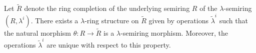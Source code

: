 Let $\tilde{R}$ denote the ring completion of the underlying semiring $R$ of the $\lambda$-semiring $(R, \lambda^i)$. There exists a $\lambda$-ring structure on $\tilde{R}$ given by operations $\tilde{\lambda}^i$ such that the natural morphism $\theta: R \to \tilde{R}$ is a $\lambda$-semiring morphism. Moreover, the operations $\tilde{\lambda}^i$ are unique with respect to this property.
